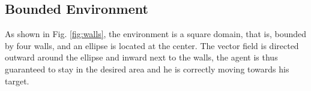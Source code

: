 \subsection{Bounded Environment}

As shown in Fig. \ref{fig:walls}, the environment is a square domain, that is, bounded by four walls, and an ellipse is located at the center. The vector field is directed outward around the ellipse and inward next to the walls, the agent is thus guaranteed to stay in the desired area and he is correctly moving towards his target.

